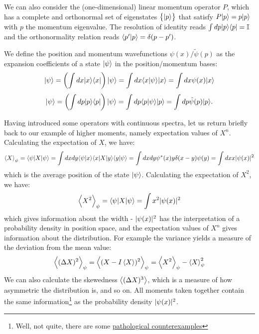 We can also consider the (one-dimensional) linear momentum operator $P$, which has a complete and orthonormal set of eigenstates $\set{\lvert p \rangle}$ that satisfy $P\lvert p \rangle = p\lvert p \rangle$ with $p$ the momentum eigenvalue. The resolution of identity reads $\int dp \lvert p \rangle \langle p \rvert = \mathbb{I}$ and the orthonormality relation reads $\langle p' \lvert p \rangle = \delta(p - p')$. 

We define the position and momentum wavefunctions $\psi(x)/\tilde{\psi}(p)$ as the expansion coefficients of a state $\lvert \psi \rangle$ in the position/momentum bases:
\begin{equation}\label{eq-positionwf}
    \lvert \psi \rangle = \left(\int dx \lvert x \rangle \langle x \rvert\right)\lvert \psi \rangle = \int dx \langle x \lvert \psi \rangle \lvert x \rangle = \int dx \psi(x) \lvert x \rangle
\end{equation}
\begin{equation}\label{eq-momentumwf}
    \lvert \psi \rangle = \left(\int dp \lvert p \rangle \langle p \rvert\right) \lvert \psi \rangle = \int dp \langle p \lvert \psi \rangle \lvert p \rangle = \int dp \tilde{\psi}(p) \lvert p \rangle.
\end{equation}

Having introduced some operators with continuous spectra, let us return briefly back to our example of higher moments, namely expectation values of $X^n$. Calculating the expectation of $X$, we have:
\begin{equation}
   \left< X \right>_\psi =  \langle \psi \rvert X\lvert \psi \rangle = \int dx dy \langle \psi \lvert x \rangle \langle x \rvert X\lvert y \rangle \langle y \lvert \psi \rangle = \int dx dy \psi^*(x) y\delta(x - y) \psi(y) = \int dx x\lvert \psi(x) \rvert^2
\end{equation}
which is the average position of the state $\lvert \psi \rangle$. Calculating the expectation of $X^2$, we have:
\begin{equation}
    \left< X^2 \right>_\psi = \langle \psi \rvert X\lvert \psi \rangle = \int x^2 \lvert \psi(x) \rvert^2
\end{equation}
which gives information about the width - $\lvert \psi(x) \rvert^2$ has the interpretation of a probability density in position space, and the expectation values of $X^n$ gives information about the distribution. For example the variance yields a measure of the deviation from the mean value:
\begin{equation}
    \left< (\Delta X)^2 \right>_\psi = \left< (X - I\left< X \right>)^2 \right>_\psi = \left< X^2 \right>_\psi - \left< X \right>^2_\psi
\end{equation} 
We can also calculate the skewedness $\left< (\Delta X)^3 \right>$, which is a measure of how asymmetric the distribution is, and so on. All moments taken together contain the same information\footnote{Well, not quite, there are some \href{https://math.stackexchange.com/questions/1790858/two-random-variables-with-same-moments}{pathological counterexamples}} as the probability density $\lvert \psi(x) \rvert^2$. 

